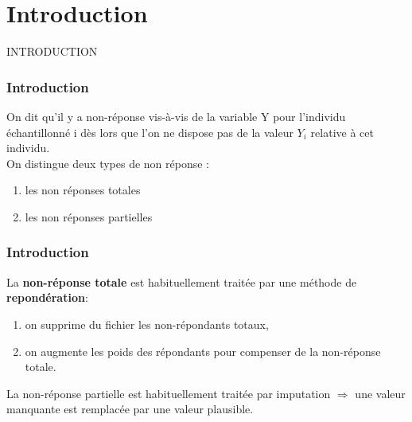 \section{Introduction} %

\begin{frame}{}
	
	\huge \begin{center}
		INTRODUCTION
	\end{center}
	
\end{frame}

\begin{frame}
	\frametitle{Introduction}
  


On dit qu'il y a non-réponse vis-à-vis de la variable Y pour l'individu échantillonné i dès lors que l'on ne dispose pas de la valeur $Y_i$ relative à cet individu. \\ \vspace{0.5cm}
 On distingue deux types de non réponse :
  \begin{enumerate}
  	\item les non réponses totales 
  	\item les non réponses partielles
  \end{enumerate}
 
\end{frame}


\begin{frame}
	\frametitle{Introduction}
	
La \textbf{non-réponse totale} est habituellement traitée par une méthode de \textbf{repondération}: \vspace{0.5cm}
	
\begin{enumerate}
\item	on supprime du fichier les non-répondants totaux,
\item	on augmente les poids des répondants pour compenser de la non-réponse totale.
\end{enumerate} 

\vspace{0.5cm}

La non-réponse partielle est habituellement traitée par imputation $\Rightarrow$
une valeur manquante est remplacée par une valeur plausible.


\end{frame}

